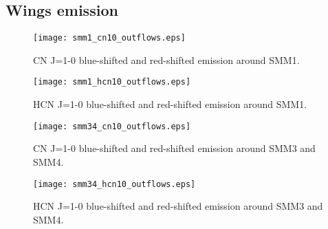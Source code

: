 \documentclass{aa}
\begin{document}
\begin{appendix} %
\section{Wings emission}

\begin{figure}
\texttt{[image: smm1\_cn10\_outflows.eps]}
\caption{CN J=1-0 blue-shifted and red-shifted emission around SMM1.}
\label{h13cn10}
\end{figure}

\begin{figure}
\texttt{[image: smm1\_hcn10\_outflows.eps]}
\caption{HCN J=1-0 blue-shifted and red-shifted emission around SMM1.}
\label{h13cn10}
\end{figure}

\begin{figure}
\texttt{[image: smm34\_cn10\_outflows.eps]}
\caption{CN J=1-0 blue-shifted and red-shifted emission around SMM3 and SMM4.}
\label{h13cn10}
\end{figure}

\begin{figure}
\texttt{[image: smm34\_hcn10\_outflows.eps]}
\caption{HCN J=1-0 blue-shifted and red-shifted emission around SMM3 and SMM4.}
\label{h13cn10}
\end{figure}

\end{appendix}
\end{document}
